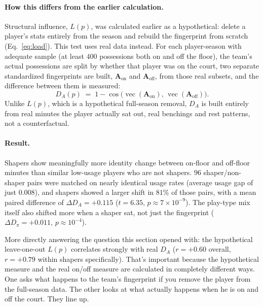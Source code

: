 \documentclass[11pt]{article}
\newcommand{\Amat}{\ensuremath{\bm{A}}} %
\newcommand{\load}{\ensuremath{L}} %
\newcommand{\cossim}{\operatorname{cos}}
\begin{document}
\paragraph{How this differs from the earlier calculation.}
Structural influence, $\load(p)$, was calculated earlier as a hypothetical: delete a
player's stats entirely from the season and rebuild the fingerprint from scratch
(Eq.~\ref{eq:load}). This test uses real data instead. For each player-season with adequate
sample (at least $400$ possessions both on and off the floor), the team's actual
possessions are split by whether that player was on the court, two separate standardized
fingerprints are built, $\Amat_{\mathrm{on}}$ and $\Amat_{\mathrm{off}}$, from those real
subsets, and the difference between them is measured:
\begin{equation}
\label{eq:DA}
D_A(p) \;=\; 1-\cossim\!\big(\operatorname{vec}(\Amat_{\mathrm{on}}),\,
\operatorname{vec}(\Amat_{\mathrm{off}})\big).
\end{equation}
Unlike $\load(p)$, which is a hypothetical full-season removal, $D_A$ is built entirely
from real minutes the player actually sat out, real benchings and rest patterns, not a
counterfactual.

\paragraph{Result.}
Shapers show meaningfully more identity change between on-floor and off-floor minutes than
similar low-usage players who are not shapers. $96$ shaper/non-shaper pairs were matched on
nearly identical usage rates (average usage gap of just $0.008$), and shapers showed a
larger shift in $81\%$ of those pairs, with a mean paired difference of
$\Delta D_A=+0.115$ ($t=6.35$, $p\approx 7\times10^{-9}$). The play-type mix itself also
shifted more when a shaper sat, not just the fingerprint
($\Delta D_\pi=+0.011$, $p\approx10^{-4}$).

More directly answering the question this section opened with: the hypothetical leave-one-out
$\load(p)$ correlates strongly with real $D_A$ ($r=+0.60$ overall, $r=+0.79$ within
shapers specifically). That's important because the hypothetical measure and the real on/off
measure are calculated in completely different ways. One asks what happens to the team's
fingerprint if you remove the player from the full-season data. The other looks at what
actually happens when he is on and off the court. They line up.
\end{document}
